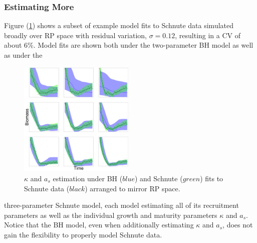 %
\subsubsection{Estimating More\label{estMore}}

%
Figure (\ref{estAK}) shows a subset of example model fits to Schnute data 
simulated broadly over RP space with residual variation, $\sigma=0.12$, 
resulting in a CV of about 6\%.
Model fits are shown both under the two-parameter BH model as well as under the
\begin{figure}
\includegraphics[width=0.49\textwidth]{../ddBias/indexGridKAExpT45N300A0-1AS10K0.1.png}
\caption{
$\kappa$ and $a_s$ estimation under BH ($blue$) and Schnute ($green$) fits to
Schnute data ($black$) arranged to mirror RP space. %
}\label{estAK}
\end{figure}
three-parameter Schnute model, each model estimating all of its recruitment
parameters as 
well as the individual growth and maturity parameters $\kappa$ and $a_s$.
Notice that the BH model, even when additionally estimating $\kappa$ and $a_s$,
does not gain the flexibility to properly model Schnute data.

